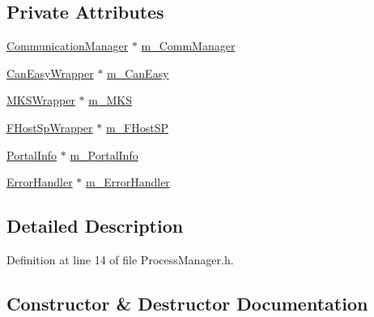 \subsection*{Private Attributes}
\begin{DoxyCompactItemize}
\item 
\hyperlink{class_r_w_1_1_c_o_r_e_1_1_communication_manager}{Communication\+Manager} $\ast$ \hyperlink{class_r_w_1_1_c_o_r_e_1_1_process_manager_ae2148c7df93ab1533c4d0370fbd7c60a}{m\+\_\+\+Comm\+Manager}
\item 
\hyperlink{class_r_w_1_1_c_o_r_e_1_1_can_easy_wrapper}{Can\+Easy\+Wrapper} $\ast$ \hyperlink{class_r_w_1_1_c_o_r_e_1_1_process_manager_a18728a50d6e8ee518aaa30656fb6c666}{m\+\_\+\+Can\+Easy}
\item 
\hyperlink{class_r_w_1_1_c_o_r_e_1_1_m_k_s_wrapper}{M\+K\+S\+Wrapper} $\ast$ \hyperlink{class_r_w_1_1_c_o_r_e_1_1_process_manager_a42e601b8fb2073846b13fb0b5fcb6d1a}{m\+\_\+\+M\+KS}
\item 
\hyperlink{class_r_w_1_1_c_o_r_e_1_1_f_host_sp_wrapper}{F\+Host\+Sp\+Wrapper} $\ast$ \hyperlink{class_r_w_1_1_c_o_r_e_1_1_process_manager_aa4122a26664468838c764c93532740fa}{m\+\_\+\+F\+Host\+SP}
\item 
\hyperlink{class_r_w_1_1_c_o_r_e_1_1_portal_info}{Portal\+Info} $\ast$ \hyperlink{class_r_w_1_1_c_o_r_e_1_1_process_manager_aba833f8c7003590a66ff6118fa2cc86d}{m\+\_\+\+Portal\+Info}
\item 
\hyperlink{class_r_w_1_1_c_o_r_e_1_1_error_handler}{Error\+Handler} $\ast$ \hyperlink{class_r_w_1_1_c_o_r_e_1_1_process_manager_ab3bb733bfe0da01794bd4b8674ff8ef9}{m\+\_\+\+Error\+Handler}
\end{DoxyCompactItemize}


\subsection{Detailed Description}


Definition at line 14 of file Process\+Manager.\+h.



\subsection{Constructor \& Destructor Documentation}
\hypertarget{class_r_w_1_1_c_o_r_e_1_1_process_manager_adca4f2b37dd753be8064af3601855703}{}\label{class_r_w_1_1_c_o_r_e_1_1_process_manager_adca4f2b37dd753be8064af3601855703} 
